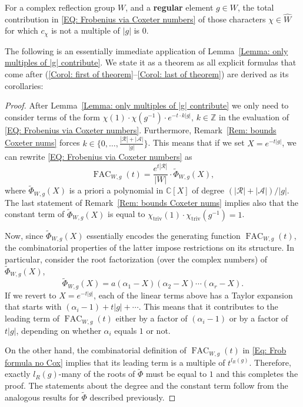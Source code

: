 \documentclass[ALCO, Unicode]{cedram}
\newcommand{\op}[1]{\operatorname{#1}}
\newcommand{\ZZ}{\mathbb{Z}}
\newcommand{\CC}{\mathbb{C}}
\newcommand{\op}[1]{\operatorname{#1}}
\begin{document}
\begin{lemma}
\label{Lemma: only multiples of |g| contribute}
For a complex reflection group $W$, and a \textbf{regular} element $g\in W$, the total contribution in \eqref{EQ: Frobenius via Coxeter numbers} of those characters $\chi\in\widehat{W}$ for which $c_{\chi}$ is not a multiple of $|g|$ is $0$.
\end{lemma}


The following is an essentially immediate application of Lemma~\ref{Lemma: only multiples of |g| contribute}. We state it as a theorem as all explicit formulas that come after (\ref{Corol: first of theorem}--\ref{Corol: last of theorem}) are derived as its corollaries:


\mainthm
\begin{proof}
After Lemma~\ref{Lemma: only multiples of |g| contribute} we only need to consider terms of the form $\chi(1)\cdot\chi(g^{-1})\cdot e^{-t\cdot k|g|},\,k\in\ZZ$ in the evaluation of \eqref{EQ: Frobenius via Coxeter numbers}. Furthermore, Remark~\ref{Rem: bounds Coxeter nums} forces $k\in \{0,\dots,\frac{|\mathcal{R}|+|\mathcal{A}|}{|g|}\}$. This means that if we set $X=e^{-t|g|}$, we can rewrite \eqref{EQ: Frobenius via Coxeter numbers} as $$\op{FAC}_{W,g}(t)=\dfrac{e^{t|\mathcal{R}|}}{|W|}\cdot \tilde{\Phi}_{W,g}(X),$$ where $\tilde{\Phi}_{W,g}(X)$ is a priori a polynomial in $\CC[X]$ of degree $(|\mathcal{R}|+|\mathcal{A}|)/|g|$. The last statement of Remark~\ref{Rem: bounds Coxeter nums} implies also that the constant term of $\tilde{\Phi}_{W,g}(X)$ is equal to $\chi_{\op{triv}}(1)\cdot\chi_{\op{triv}}(g^{-1})=1$.


Now, since $\tilde{\Phi}_{W,g}(X)$ essentially encodes the generating function $\op{FAC}_{W,g}(t)$, the combinatorial properties of the latter impose restrictions on its structure. In particular, consider the root factorization (over the complex numbers) of $\tilde{\Phi}_{W,g}(X)$,
\[
\tilde{\Phi}_{W,g}(X)=a(\alpha_1-X)(\alpha_2-X)\cdots (\alpha_r-X).
\]
If we revert to $X=e^{-t|g|}$, each of the linear terms above has a Taylor expansion that starts with $(\alpha_i-1)+t|g|+\cdots$. This means that it contributes to the leading term of $\op{FAC}_{W,g}(t)$ either by a factor of $(\alpha_i-1)$ or by a factor of $t|g|$, depending on whether $\alpha_i$ equals $1$ or not.

On the other hand, the combinatorial definition of $\op{FAC}_{W,g}(t)$ in \eqref{Eq: Frob formula no Cox} implies that its leading term is a multiple of $t^{l_R(g)}$. Therefore, exactly $l_{R}(g)$-many of the roots of $\tilde{\Phi}$ must be equal to $1$ and this completes the proof. The statements about the degree and the constant term follow from the analogous results for $\tilde{\Phi}$ described previously. 
\end{proof}
\end{document}
